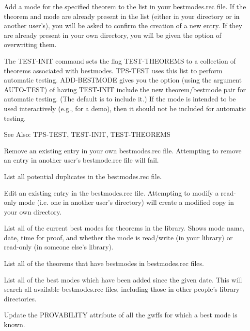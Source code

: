 \begin{description} 
\item[ADD-BESTMODE]  
Add a mode for the specified theorem to the list in your
bestmodes.rec file. If the theorem and mode are already present in 
the list (either in your directory or in another user's), you will
be asked to confirm the creation of a new entry. If they are already 
present in your own directory, you will be given the option of 
overwriting them.

The TEST-INIT command sets the flag TEST-THEOREMS to a collection
of theorems associated with bestmodes.  TPS-TEST uses this list
to perform automatic testing.  ADD-BESTMODE gives you the option 
(using the argument AUTO-TEST) of having TEST-INIT include the 
new theorem/bestmode pair for automatic testing.  (The default 
is to include it.)  If the mode is intended to be used interactively 
(e.g., for a demo), then it should not be included for automatic testing.

See Also: TPS-TEST, TEST-INIT, TEST-THEOREMS

\item[DELETE-BESTMODE]  
Remove an existing entry in your own bestmodes.rec file.
Attempting to remove an entry in another user's bestmode.rec
file will fail.

\item[FIND-DUP-MODES]  
List all potential duplicates in the bestmodes.rec file.

\item[MODIFY-BESTMODE]  
Edit an existing entry in the bestmodes.rec file. 
Attempting to modify a read-only mode (i.e. one in another user's
directory) will create a modified copy in your own directory.

\item[SHOW-BESTMODE]  
List all of the current best modes for theorems in the library.
Shows mode name, date, time for proof, and whether the mode is read/write
(in your library) or read-only (in someone else's library).

\item[SHOW-BESTMODE-THMS]  
List all of the theorems that have bestmodes in bestmodes.rec files.

\item[SHOW-NEW-BESTMODES]  
List all of the best modes which have been added since the 
given date. This will search all available bestmodes.rec files,
including those in other people's library directories.

\item[UPDATE-PROVABILITY]  
Update the PROVABILITY attribute of all the gwffs for which a 
best mode is known.
\item
\end{description}

